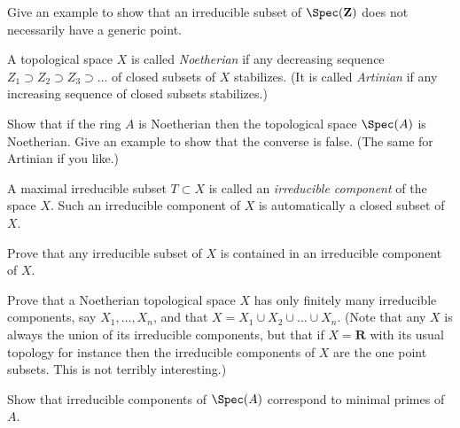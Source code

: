 \begin{exercise}
\label{exercise-irreducible-subset-not-generic}
Give an example to show that an irreducible
subset of $\Spec(\mathbf{Z})$ does not necessarily have a generic point.
\end{exercise}

\begin{definition}
\label{definition-Noetherian-space}
A topological space $X$ is called {\it Noetherian} if any
decreasing sequence $Z_1\supset Z_2 \supset Z_3\supset \ldots$
of closed subsets of $X$ stabilizes.
(It is called {\it Artinian} if any increasing sequence of closed
subsets stabilizes.)
\end{definition}

\begin{exercise}
\label{exercise-Noetherian-spec}
Show that if the ring $A$ is Noetherian then
the topological space $\Spec(A)$ is Noetherian. Give an
example to show that the converse is false. (The same for
Artinian if you like.)
\end{exercise}

\begin{definition}
\label{definition-irreducible-component}
A maximal irreducible subset $T\subset X$ is called an
{\it irreducible component} of the space $X$. Such an irreducible
component of $X$ is automatically a closed subset of $X$.
\end{definition}

\begin{exercise}
\label{exercise-irreducible-in-irreducible}
Prove that any irreducible subset
of $X$ is contained in an irreducible component of $X$.
\end{exercise}

\begin{exercise}
\label{exercise-Noetherian-finite-nr-irreducible}
Prove that a Noetherian topological space $X$
has only finitely many irreducible components, say $X_1, \ldots, X_n$,
and that $X = X_1\cup X_2\cup\ldots\cup X_n$. (Note that
any $X$ is always the union of its irreducible components, but that
if $X = {\mathbf R}$ with its usual topology for instance then the irreducible
components of $X$ are the one point subsets. This is not
terribly interesting.)
\end{exercise}

\begin{exercise}
\label{exercise-irreducible-components-minimal-primes}
Show that irreducible components of $\Spec(A)$
correspond to minimal primes of $A$.
\end{exercise}


